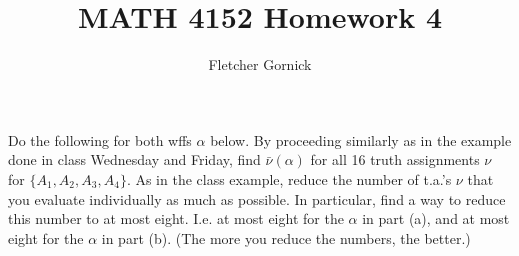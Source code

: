 \documentclass[11pt]{article}
\newcommand{\n}{\vspace{0.5cm}}
\begin{document}
\title{\vspace{-1.5cm}MATH 4152 Homework 4}
  \author{Fletcher Gornick}
  \maketitle
  Do the following for both wffs \(\alpha\) below.  By proceeding similarly as in the example done in class Wednesday and Friday, find \(\bar\nu(\alpha)\) for all 16 truth assignments \(\nu\) for \(\{A_1,A_2,A_3,A_4\}\).  As in the class example, reduce the number of t.a.'s \(\nu\) that you evaluate individually as much as possible.  In particular, find a way to reduce this number to at most eight.  I.e. at most eight for the \(\alpha\) in part (a), and at most eight for the \(\alpha\) in part (b).  (The more you reduce the numbers, the better.) \n
\end{document}
